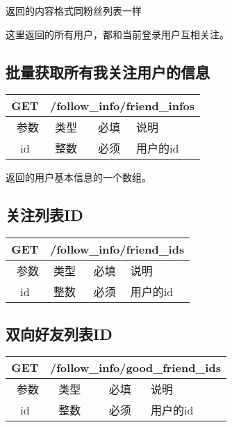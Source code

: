 返回的内容格式同粉丝列表一样

这里返回的所有用户，都和当前登录用户互相关注。


\subsection{批量获取所有我关注用户的信息}

\begin{table}[H]
   \begin{center}
\begin{tabular}{|c|c|c|p{12cm}|}
\hline
GET & \multicolumn{3}{|c|}{/follow\_info/friend\_infos} \\
\hline\hline
 \  参数  & 类型 & 必填 &  说明  \\
\hline
 id  & 整数 & 必须 &  用户的id\\
\hline
\end{tabular}
   \end{center}
\end{table}

返回的用户基本信息的一个数组。



\subsection{关注列表ID}

\begin{table}[H]
   \begin{center}
\begin{tabular}{|c|c|c|p{12cm}|}
\hline
GET & \multicolumn{3}{|c|}{/follow\_info/friend\_ids} \\
\hline\hline
 \  参数  & 类型 & 必填 &  说明  \\
\hline
 id  & 整数 & 必须 &  用户的id\\
\hline

\end{tabular}
   \end{center}
\end{table}

\subsection{双向好友列表ID}

\begin{table}[H]
   \begin{center}
\begin{tabular}{|c|c|c|p{12cm}|}
\hline
GET & \multicolumn{3}{|c|}{/follow\_info/good\_friend\_ids} \\
\hline\hline
 \  参数  & 类型 & 必填 &  说明  \\
\hline
 id  & 整数 & 必须 &  用户的id\\
\hline

\end{tabular}
   \end{center}
\end{table}

